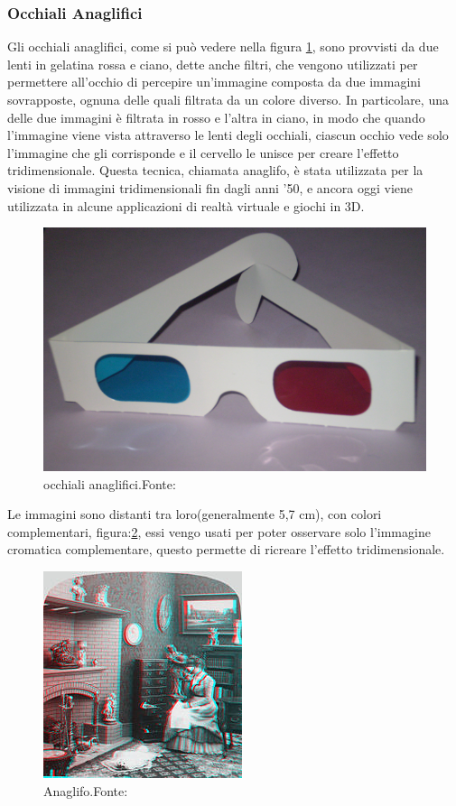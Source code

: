 \documentclass[
a4paper,
cleardoublepage=empty,
headings=twolinechapter,
numbers=autoenddot,
]{scrbook}
\begin{document}
	\subsubsection{Occhiali Anaglifici}\label{chap:occhiali_anaglifici}
	Gli occhiali anaglifici, come si può vedere nella figura \ref{fig:occhiali_anaglifici}, sono provvisti da due lenti in gelatina rossa e ciano, dette anche filtri, che vengono utilizzati per permettere all'occhio di percepire un'immagine composta da due immagini sovrapposte, ognuna delle quali filtrata da un colore diverso. In particolare, una delle due immagini è filtrata in rosso e l'altra in ciano, in modo che quando l'immagine viene vista attraverso le lenti degli occhiali, ciascun occhio vede solo l'immagine che gli corrisponde e il cervello le unisce per creare l'effetto tridimensionale. Questa tecnica, chiamata anaglifo, è stata utilizzata per la visione di immagini tridimensionali fin dagli anni '50, e ancora oggi viene utilizzata in alcune applicazioni di realtà virtuale e giochi in 3D.
	\begin{figure}[H]
		\centering
		\includegraphics[width=0.6\linewidth]{image/occhiali_anaglifici}
		\caption{occhiali anaglifici.Fonte:\cite{Anaglifo_image}}
		\label{fig:occhiali_anaglifici}
	\end{figure}
	Le immagini sono distanti tra loro(generalmente 5,7 cm), con colori complementari, figura:\ref{fig:anaglifo}, essi vengo usati per poter osservare solo l'immagine cromatica complementare, questo permette di ricreare l'effetto tridimensionale.
	 \begin{figure}[H]
	 	\centering
	 	\includegraphics[width=0.6\linewidth]{image/anaglifo}
	 	\caption{Anaglifo.Fonte:\cite{Anaglifo_image}}
	 	\label{fig:anaglifo}
	 \end{figure}
\end{document}

